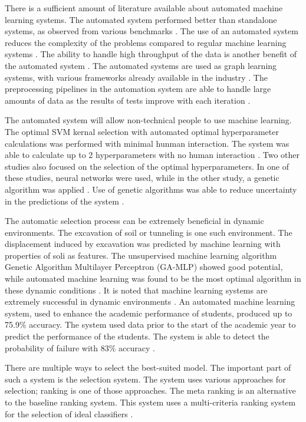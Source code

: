 \documentclass[a4paper,fleqn]{cas-dc}
\begin{document}
There is a sufficient amount of literature available about automated machine learning systems. The automated system performed better than standalone systems, as observed from various benchmarks \cite{ref_paper_a_5}. The use of an automated system reduces the complexity of the problems compared to regular machine learning systems \cite{ref_paper_a_1}. The ability to handle high throughput of the data is another benefit of the automated system \cite{ref_paper_a_3}. The automated systems are used as graph learning systems, with various frameworks already available in the industry \cite{ref_paper_a_4}. The preprocessing pipelines in the automation system are able to handle large amounts of data as the results of tests improve with each iteration \cite{ref_paper_a_12}.

The automated system will allow non-technical people to use machine learning. The optimal SVM kernal selection with automated optimal hyperparameter calculations was performed with minimal hunman interaction. The system was able to calculate up to 2 hyperparameters with no human interaction \cite{ref_paper_3}. Two other studies also focused on the selection of the optimal hyperparameters. In one of these studies, neural networks were used, while in the other study, a genetic algorithm was applied \cite{ref_paper_a_14,ref_paper_39}. Use of genetic algorithms was able to reduce uncertainty in the predictions of the system \cite{ref_paper_39}.

The automatic selection process can be extremely beneficial in dynamic environments. The excavation of soil or tunneling is one such environment. The displacement induced by excavation was predicted by machine learning with properties of soli as features. The unsupervised machine learning algorithm Genetic Algorithm Multilayer Perceptron (GA-MLP) showed good potential, while automated machine learning was found to be the most optimal algorithm in these dynamic conditions \cite{ref_paper_1}. It is noted that machine learning systems are extremely successful in dynamic environments \cite{ref_paper_1,ref_paper_13}. An automated machine learning system, used to enhance the academic performance of students, produced up to 75.9\% accuracy. The system used data prior to the start of the academic year to predict the performance of the students. The system is able to detect the probability of failure with 83\% accuracy \cite{ref_paper_a_7}.

There are multiple ways to select the best-suited model. The important part of such a system is the selection system. The system uses various approaches for selection; ranking is one of those approaches. The meta ranking is an alternative to the baseline ranking system. This system uses a multi-criteria ranking system for the selection of ideal classifiers \cite{ref_paper_23}.
\end{document}
